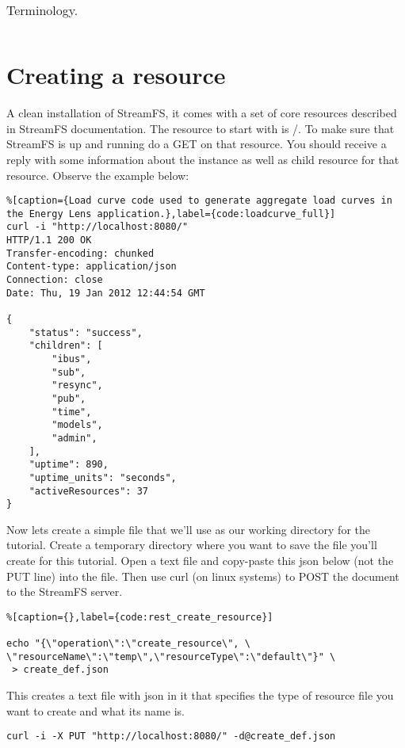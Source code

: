 \begin{table}[h!]
\begin{center}
\begin{tabular}{| r | l | l |}
\end{tabular}
\caption{Terminology.}
\label{tab:tutorial_terminology}
\end{center}
\end{table}

  
\section{Creating a resource}

A clean installation of StreamFS, it comes with a set of core resources described in StreamFS documentation. The resource to start with is /. To make sure that StreamFS is up and running do a GET on that resource. You should receive a reply with some information about the instance as well as child resource for that resource. Observe the example below:

\begin{lstlisting}%[caption={Load curve code used to generate aggregate load curves in the Energy Lens application.},label={code:loadcurve_full}]
curl -i "http://localhost:8080/"
HTTP/1.1 200 OK
Transfer-encoding: chunked
Content-type: application/json
Connection: close
Date: Thu, 19 Jan 2012 12:44:54 GMT

{
    "status": "success",
    "children": [
        "ibus",
        "sub",
        "resync",
        "pub",
        "time",
        "models",
        "admin",
    ],
    "uptime": 890,
    "uptime_units": "seconds",
    "activeResources": 37
}
\end{lstlisting}

Now lets create a simple file that we'll use as our working directory for the tutorial. Create a temporary directory where you want to save the file you'll create for this tutorial. Open a text file and copy-paste this json below (not the PUT line) into the file. Then use curl (on linux systems) to POST the document to the StreamFS server.

\begin{lstlisting}%[caption={},label={code:rest_create_resource}]

echo "{\"operation\":\"create_resource\", \
\"resourceName\":\"temp\",\"resourceType\":\"default\"}" \
 > create_def.json

 \end{lstlisting}

This creates a text file with json in it that specifies the type of resource file you want to create and what its name is.

\begin{lstlisting}
curl -i -X PUT "http://localhost:8080/" -d@create_def.json
 \end{lstlisting}

